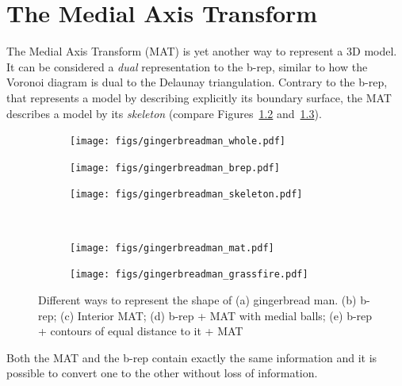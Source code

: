 
\setchapterpreamble[u]{\margintoc}

\graphicspath{{mat/}}

\chapter{The Medial Axis Transform}%
\label{chap:mat}

The Medial Axis Transform (MAT) is yet another way to represent a 3D model.
It can be considered a \emph{dual} representation to the b-rep, similar to how the Voronoi diagram is dual to the Delaunay triangulation. 
Contrary to the b-rep, that represents a model by describing explicitly its boundary surface, the MAT describes a model by its \emph{skeleton} (compare Figures~\ref{fig:gbm:brep} and~\ref{fig:gbm:maxis}).
\begin{figure}
	\centering
	\begin{subfigure}[b]{0.3\linewidth}
		\centering
		\texttt{[image: figs/gingerbreadman\_whole.pdf]}
		\caption{}%
		\label{fig:gbm:whole}
	\end{subfigure}
	\begin{subfigure}[b]{0.3\linewidth}
		\centering
		\texttt{[image: figs/gingerbreadman\_brep.pdf]}
		\caption{}%
		\label{fig:gbm:brep}
	\end{subfigure}
	\begin{subfigure}[b]{0.3\linewidth}
		\centering
		\texttt{[image: figs/gingerbreadman\_skeleton.pdf]}
		\caption{}%
		\label{fig:gbm:maxis}
	\end{subfigure}\\
	\begin{subfigure}[b]{0.3\linewidth}
		\centering
		\texttt{[image: figs/gingerbreadman\_mat.pdf]}
		\caption{}%
		\label{fig:gbm:mballs}
	\end{subfigure}
	\begin{subfigure}[b]{0.3\linewidth}
		\centering
		\texttt{[image: figs/gingerbreadman\_grassfire.pdf]}
		\caption{}%
		\label{fig:gbm:dt}
	\end{subfigure}
	
	\caption[Different ways to represent the shape of gingerbread man]{Different ways to represent the shape of (a) gingerbread man. (b) b-rep; (c) Interior MAT\@; (d) b-rep + MAT with medial balls; (e) b-rep + contours of equal distance to it + MAT}%
	\label{fig:gingerman}
\end{figure}
Both the MAT and the b-rep contain exactly the same information and it is possible to convert one to the other without loss of information.

